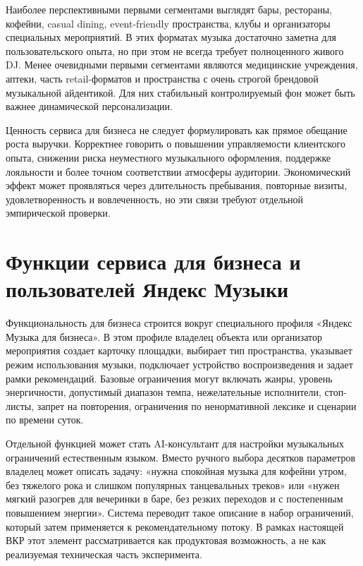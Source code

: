 Наиболее перспективными первыми сегментами выглядят бары, рестораны, кофейни, casual dining, event-friendly пространства, клубы и организаторы специальных мероприятий. В этих форматах музыка достаточно заметна для пользовательского опыта, но при этом не всегда требует полноценного живого DJ. Менее очевидными первыми сегментами являются медицинские учреждения, аптеки, часть retail-форматов и пространства с очень строгой брендовой музыкальной айдентикой. Для них стабильный контролируемый фон может быть важнее динамической персонализации.

Ценность сервиса для бизнеса не следует формулировать как прямое обещание роста выручки. Корректнее говорить о повышении управляемости клиентского опыта, снижении риска неуместного музыкального оформления, поддержке лояльности и более точном соответствии атмосферы аудитории. Экономический эффект может проявляться через длительность пребывания, повторные визиты, удовлетворенность и вовлеченность, но эти связи требуют отдельной эмпирической проверки.

\section{Функции сервиса для бизнеса и пользователей Яндекс Музыки}
\label{sec:service:functions}

Функциональность для бизнеса строится вокруг специального профиля «Яндекс Музыка для бизнеса». В этом профиле владелец объекта или организатор мероприятия создает карточку площадки, выбирает тип пространства, указывает режим использования музыки, подключает устройство воспроизведения и задает рамки рекомендаций. Базовые ограничения могут включать жанры, уровень энергичности, допустимый диапазон темпа, нежелательные исполнители, стоп-листы, запрет на повторения, ограничения по ненормативной лексике и сценарии по времени суток.

Отдельной функцией может стать AI-консультант для настройки музыкальных ограничений естественным языком. Вместо ручного выбора десятков параметров владелец может описать задачу: «нужна спокойная музыка для кофейни утром, без тяжелого рока и слишком популярных танцевальных треков» или «нужен мягкий разогрев для вечеринки в баре, без резких переходов и с постепенным повышением энергии». Система переводит такое описание в набор ограничений, который затем применяется к рекомендательному потоку. В рамках настоящей ВКР этот элемент рассматривается как продуктовая возможность, а не как реализуемая техническая часть эксперимента.

